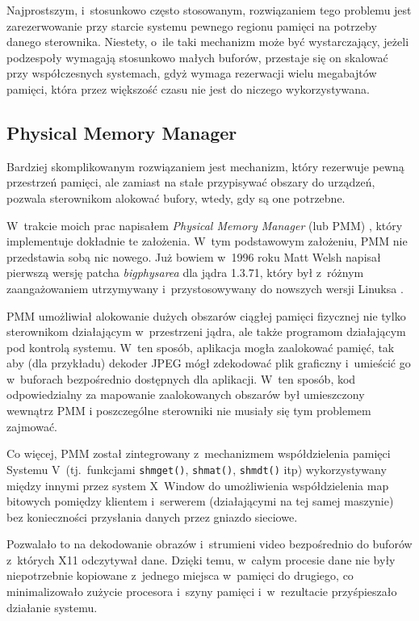 Najprostszym, i~stosunkowo często stosowanym, rozwiązaniem tego
problemu jest zarezerwowanie przy starcie systemu pewnego regionu
pamięci na potrzeby danego sterownika.  Niestety, o~ile taki mechanizm
może być wystarczający, jeżeli podzespoły wymagają stosunkowo małych
buforów, przestaje się on skalować przy współczesnych systemach, gdyż
wymaga rezerwacji wielu megabajtów pamięci, która przez większość
czasu nie jest do niczego wykorzystywana.

\subsection{Physical Memory Manager}\label{sec:pmm}

Bardziej skomplikowanym rozwiązaniem jest mechanizm, który rezerwuje
pewną przestrzeń pamięci, ale zamiast na stałe przypisywać obszary do
urządzeń, pozwala sterownikom alokować bufory, wtedy, gdy są one
potrzebne.

W~trakcie moich prac napisałem {\it Physical Memory Manager} (lub PMM)
\cite{patch:pmm}, który implementuje dokładnie te założenia. W~tym
podstawowym założeniu, PMM nie przedstawia sobą nic nowego.  Już
bowiem w~1996 roku Matt Welsh napisał pierwszą wersję patcha
\emph{bigphysarea} dla jądra 1.3.71, który był z~różnym zaangażowaniem
utrzymywany i~przystosowywany do nowszych wersji Linuksa
\cite{patch:bigphys}.

PMM umożliwiał alokowanie dużych obszarów ciągłej pamięci fizycznej
nie tylko sterownikom działającym w~przestrzeni jądra, ale także
programom działającym pod kontrolą systemu.  W~ten sposób, aplikacja
mogła zaalokować pamięć, tak aby (dla przykładu) dekoder JPEG mógł
zdekodować plik graficzny i~umieścić go w~buforach bezpośrednio
dostępnych dla aplikacji.  W~ten sposób, kod odpowiedzialny za
mapowanie zaalokowanych obszarów był umieszczony wewnątrz PMM
i poszczególne sterowniki nie musiały się tym problemem zajmować.

Co więcej, PMM został zintegrowany z~mechanizmem współdzielenia
pamięci Systemu V~(tj.\ funkcjami \lstinline|shmget()|,
\lstinline|shmat()|, \lstinline|shmdt()| itp) wykorzystywany między
innymi przez system X~Window do umożliwienia współdzielenia map
bitowych pomiędzy klientem i~serwerem (działającymi na tej samej
maszynie) bez konieczności przysłania danych przez gniazdo sieciowe.

Pozwalało to na dekodowanie obrazów i~strumieni video bezpośrednio do
buforów z~których X11 odczytywał dane.  Dzięki temu, w~całym procesie
dane nie były niepotrzebnie kopiowane z~jednego miejsca w~pamięci do
drugiego, co minimalizowało zużycie procesora i~szyny pamięci
i~w~rezultacie przyśpieszało działanie systemu.

